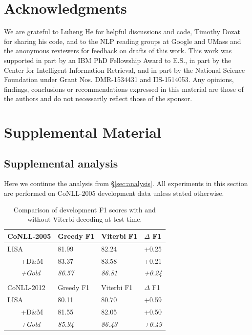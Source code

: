 \documentclass[11pt,a4paper]{article}
\begin{document}
\section*{Acknowledgments}
We are grateful to Luheng He for helpful discussions and code, Timothy Dozat for sharing his code, and to the NLP reading groups at Google and UMass and the anonymous reviewers for feedback on drafts of this work. This work was supported in part by an IBM PhD Fellowship Award to E.S., in part by the Center for Intelligent Information Retrieval, and in part by the National Science Foundation under Grant Nos. DMR-1534431 and IIS-1514053. Any opinions, findings, conclusions or recommendations expressed in this material are those of the authors and do not necessarily reflect those of the sponsor.




\clearpage\newpage
\appendix
\section{Supplemental Material \label{sec:supplemental}}

\subsection{Supplemental analysis \label{app:analysis}}
Here we continue the analysis from \S\ref{sec:analysis}. All experiments in this section are performed on CoNLL-2005 development data unless stated otherwise.

\begin{table}
\begin{tabular}{llll}
CoNLL-2005 & Greedy F1 & Viterbi F1 & $\Delta$ F1 \\ \hline \hline
LISA & 81.99 & 82.24 & +0.25 \\
\ \ \ \ +D\&M & 83.37 & 83.58 & +0.21 \\
\ \ \ \ \emph{+Gold} & \emph{86.57} &	\emph{86.81} &	\emph{+0.24} \\
& & & \\
CoNLL-2012 & Greedy F1 & Viterbi F1 & $\Delta$ F1 \\ \hline \hline
LISA & 80.11	& 80.70	 & +0.59 \\
\ \ \ \ +D\&M & 81.55 &	82.05 & +0.50 \\
\ \ \ \ \emph{+Gold} & \emph{85.94} &	\emph{86.43} &	\emph{+0.49} \\
\end{tabular}

\caption{Comparison of development F1 scores with and without Viterbi decoding at test time. \label{viterbi-table}}
\end{table}
\end{document}
